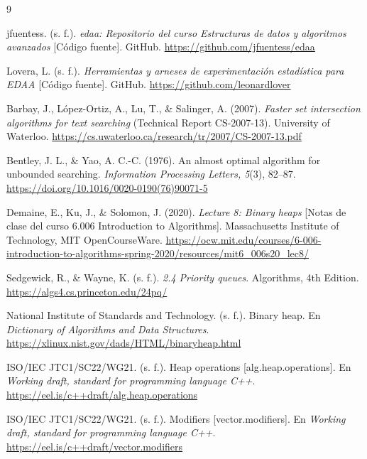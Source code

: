 \documentclass[11pt,letterpaper]{article}
\begin{document}
\begingroup
\renewcommand{\section}[2]{}%
\begin{thebibliography}{9}
\setlength{\itemsep}{2pt}
\setlength{\parskip}{0pt}

jfuentess. (s. f.).
\textit{edaa: Repositorio del curso Estructuras de datos y algoritmos
avanzados} [Código fuente].
GitHub.
\url{https://github.com/jfuentess/edaa}

Lovera, L. (s. f.).
\textit{Herramientas y arneses de experimentación estadística para EDAA} [Código fuente].
GitHub.
\url{https://github.com/leonardlover}

Barbay, J., López-Ortiz, A., Lu, T., \& Salinger, A. (2007).
\textit{Faster set intersection algorithms for text searching}
(Technical Report CS-2007-13).
University of Waterloo.
\url{https://cs.uwaterloo.ca/research/tr/2007/CS-2007-13.pdf}

Bentley, J. L., \& Yao, A. C.-C. (1976).
An almost optimal algorithm for unbounded searching.
\textit{Information Processing Letters, 5}(3), 82--87.
\url{https://doi.org/10.1016/0020-0190(76)90071-5}

Demaine, E., Ku, J., \& Solomon, J. (2020).
\textit{Lecture 8: Binary heaps}
[Notas de clase del curso 6.006 Introduction to Algorithms].
Massachusetts Institute of Technology, MIT OpenCourseWare.
\url{https://ocw.mit.edu/courses/6-006-introduction-to-algorithms-spring-2020/resources/mit6_006s20_lec8/}

Sedgewick, R., \& Wayne, K. (s. f.).
\textit{2.4 Priority queues}.
Algorithms, 4th Edition.
\url{https://algs4.cs.princeton.edu/24pq/}

National Institute of Standards and Technology. (s. f.).
Binary heap.
En \textit{Dictionary of Algorithms and Data Structures}.
\url{https://xlinux.nist.gov/dads/HTML/binaryheap.html}

ISO/IEC JTC1/SC22/WG21. (s. f.).
Heap operations [alg.heap.operations].
En \textit{Working draft, standard for programming language C++}.
\url{https://eel.is/c++draft/alg.heap.operations}

ISO/IEC JTC1/SC22/WG21. (s. f.).
Modifiers [vector.modifiers].
En \textit{Working draft, standard for programming language C++}.
\url{https://eel.is/c++draft/vector.modifiers}

\end{thebibliography}
\endgroup
\end{document}
